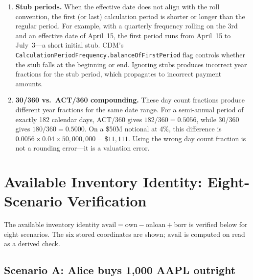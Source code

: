 \documentclass[11pt,a4paper]{article}
\begin{document}
\begin{enumerate}[nosep]
\item \textbf{Stub periods.} When the effective date does not align with the roll convention, the first (or last) calculation period is shorter or longer than the regular period. For example, with a quarterly frequency rolling on the 3rd and an effective date of April~15, the first period runs from April~15 to July~3---a short initial stub. CDM's \texttt{CalculationPeriodFrequency.balanceOfFirstPeriod} flag controls whether the stub falls at the beginning or end. Ignoring stubs produces incorrect year fractions for the stub period, which propagates to incorrect payment amounts.

\item \textbf{30/360 vs.\ ACT/360 compounding.} These day count fractions produce different year fractions for the same date range. For a semi-annual period of exactly 182 calendar days, ACT/360 gives $182/360 = 0.5056$, while 30/360 gives $180/360 = 0.5000$. On a \$50M notional at 4\%, this difference is $0.0056 \times 0.04 \times 50{,}000{,}000 = \$11{,}111$. Using the wrong day count fraction is not a rounding error---it is a valuation error.

\end{enumerate}


\clearpage
\section{Available Inventory Identity: Eight-Scenario Verification}
\label{app:invariant-verification}

The available inventory identity $\mathrm{avail} = \mathrm{own} - \mathrm{onloan} + \mathrm{borr}$ is verified below for eight scenarios. The six stored coordinates are shown; $\mathrm{avail}$ is computed on read as a derived check.

\subsection*{Scenario A: Alice buys 1{,}000 AAPL outright}
\end{document}
